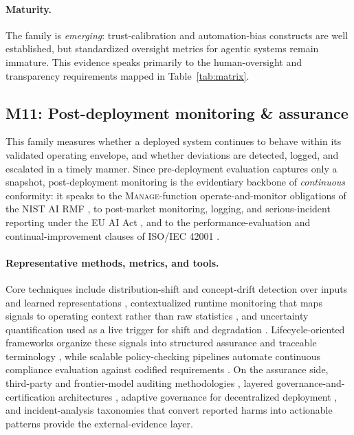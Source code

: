 \paragraph{Maturity.} The family is \textit{emerging}: trust-calibration and automation-bias constructs are well established, but standardized oversight metrics for agentic systems remain immature. This evidence speaks primarily to the human-oversight and transparency requirements mapped in Table~\ref{tab:matrix}.

\subsection{M11: Post-deployment monitoring \& assurance}

This family measures whether a deployed system continues to behave within its validated operating envelope, and whether deviations are detected, logged, and escalated in a timely manner. Since pre-deployment evaluation captures only a snapshot, post-deployment monitoring is the evidentiary backbone of \textit{continuous} conformity: it speaks to the \textsc{Manage}-function operate-and-monitor obligations of the NIST AI RMF \cite{nist2023airmf}, to post-market monitoring, logging, and serious-incident reporting under the EU AI Act \cite{euaiact2024}, and to the performance-evaluation and continual-improvement clauses of ISO/IEC 42001 \cite{iso42001}.

\paragraph{Representative methods, metrics, and tools.} Core techniques include distribution-shift and concept-drift detection over inputs and learned representations \cite{greco2024driftlens,neuralnetwork2024robustness}, contextualized runtime monitoring that maps signals to operating context rather than raw statistics \cite{leest2025contextaware}, and uncertainty quantification used as a live trigger for shift and degradation \cite{neuralnetwork2024robustness}. Lifecycle-oriented frameworks organize these signals into structured assurance and traceable terminology \cite{aisystem2024evaluation}, while scalable policy-checking pipelines automate continuous compliance evaluation against codified requirements \cite{compliance2025pasta}. On the assurance side, third-party and frontier-model auditing methodologies \cite{auditing2024frontier}, layered governance-and-certification architectures \cite{audit2025responsible}, adaptive governance for decentralized deployment \cite{governance2025adaptive}, and incident-analysis taxonomies that convert reported harms into actionable patterns \cite{incidents2025harms} provide the external-evidence layer.

